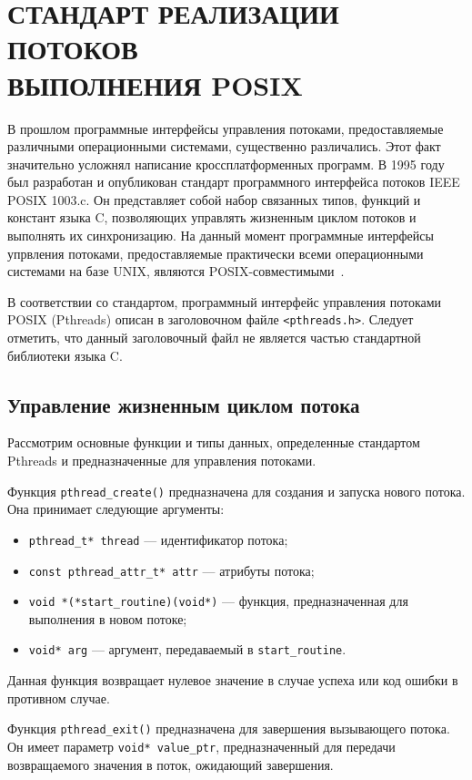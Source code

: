 \section[Стандарт реализации потоков выполнения POSIX]{%
  СТАНДАРТ РЕАЛИЗАЦИИ ПОТОКОВ \\
  ВЫПОЛНЕНИЯ POSIX}

В прошлом программные интерфейсы управления потоками,
предоставляемые различными операционными системами, существенно различались.
Этот факт значительно усложнял написание кроссплатформенных программ.
В 1995 году был разработан и опубликован стандарт
программного интерфейса потоков IEEE POSIX 1003.c.
Он представляет собой набор связанных типов, функций и констант
языка C, позволяющих управлять жизненным циклом потоков
и выполнять их синхронизацию.
На данный момент программные интерфейсы упрвления потоками,
предоставляемые практически всеми операционными системами
на базе UNIX, являются POSIX-совместимыми~\cite{pthreads_programming}.

В соответствии со стандартом, программный интерфейс управления потоками
POSIX (Pthreads) описан в заголовочном файле \texttt{<pthreads.h>}.
Следует отметить, что данный заголовочный файл не является частью
стандартной библиотеки языка C.

\subsection{Управление жизненным циклом потока}

Рассмотрим основные функции и типы данных, определенные стандартом Pthreads
и предназначенные для управления потоками.

Функция \texttt{pthread\_create()} предназначена для создания и запуска
нового потока.
Она принимает следующие аргументы:
\begin{itemize}
  \item \texttt{pthread\_t* thread} --- идентификатор потока;
  \item \texttt{const pthread\_attr\_t* attr} --- атрибуты потока;
  \item \texttt{void *(*start\_routine)(void*)} --- функция, предназначенная для
    выполнения в новом потоке;
  \item \texttt{void* arg} --- аргумент, передаваемый в \texttt{start\_routine}.
\end{itemize}
Данная функция возвращает нулевое значение в случае успеха
или код ошибки в противном случае.

Функция \texttt{pthread\_exit()} предназначена для завершения вызывающего потока.
Он имеет параметр \texttt{void* value\_ptr}, предназначенный для передачи
возвращаемого значения в поток, ожидающий завершения.

